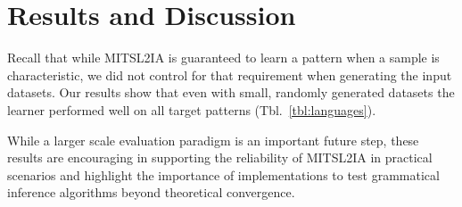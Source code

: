 \documentclass[11pt]{article}
\begin{document}


\section{Results and Discussion}

Recall that while MITSL2IA is guaranteed to learn a pattern when a sample is characteristic, we did not control for that requirement when generating the input datasets.
Our results show that even with small, randomly generated datasets the learner performed well on all target patterns (Tbl.\ \ref{tbl:languages}).

     While a larger scale evaluation paradigm is an important future step, these results are encouraging in supporting the reliability of MITSL2IA in practical scenarios and highlight the importance of implementations to test grammatical inference algorithms beyond theoretical convergence.\@
  
\end{document}
